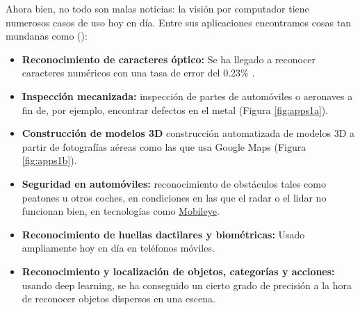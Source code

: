 Ahora bien, no todo son malas noticias: la visión por computador tiene numerosos casos de uso hoy en día. Entre sus aplicaciones encontramos cosas tan mundanas como (\citeauthor*{book:szeliski}):
\begin{itemize}
\item \textbf{Reconocimiento de caracteres óptico:} Se ha llegado a reconocer caracteres numéricos con una tasa de error del 0.23\% \cite{art:2012arXiv1202.2745C}.
\item \textbf{Inspección mecanizada:} inspección de partes de automóviles o aeronaves a fin de, por ejemplo, encontrar defectos en el metal (Figura \ref{fig:apps1a}).
\item \textbf{Construcción de modelos 3D} construcción automatizada de modelos 3D a partir de fotografías aéreas como las que usa Google Maps (Figura \ref{fig:apps1b}).
\item \textbf{Seguridad en automóviles:} reconocimiento de obstáculos tales como peatones u otros coches, en condiciones en las que el radar o el lidar no funcionan bien, en tecnologías como \href{https://www.mobileye.com/}{Mobileye}.
\item \textbf{Reconocimiento de huellas dactilares y biométricas:} Usado ampliamente hoy en día en teléfonos móviles.
\item \textbf{Reconocimiento y localización de objetos, categorías y acciones:} usando deep learning, se ha conseguido un cierto grado de precisión a la hora de reconocer objetos dispersos en una escena.
\end{itemize}

